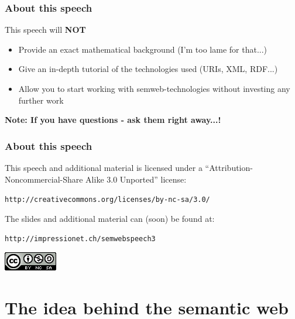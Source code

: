 \documentclass[handout]{beamer}
\begin{document}
        \begin{frame}
            \frametitle{About this speech}

            This speech will \textbf{NOT}
            \vskip 0.7cm
            \pause

            \begin{itemize}
                \item Provide an exact mathematical background (I'm too lame for that...)
                \pause
                \item Give an in-depth tutorial of the technologies used (URIs, XML, RDF...)
                \pause
                \item Allow you to start working with semweb-technologies without investing any further work
            \end{itemize}
            \vskip 0.7cm
            \pause
            \textbf{Note: If you have questions - ask them right away...!}
        \end{frame}

        \begin{frame}
            \frametitle{About this speech}

            This speech and additional material is licensed under a ``Attribution-Noncommercial-Share Alike 3.0 Unported'' license:
            \vskip 0.4cm

            \texttt{http://creativecommons.org/licenses/by-nc-sa/3.0/}
            \vskip 0.7cm

            The slides and additional material can (soon) be found at:
            \vskip 0.4cm

            \texttt{http://impressionet.ch/semwebspeech3}
            \vskip 2cm

            \begin{center}
                \includegraphics[scale=0.5]{somerights}
            \end{center}
        \end{frame}

    \section{The idea behind the semantic web}
\end{document}
